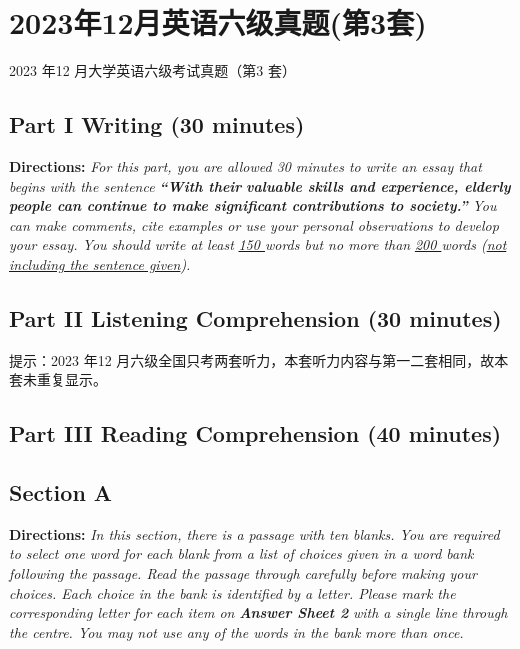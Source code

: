 \documentclass[UTF8,11pt]{ctexart}
\begin{document}
\section*{2023年12月英语六级真题(第3套)}
2023 年12 月大学英语六级考试真题（第3 套）


\subsection*{\textbf{Part I Writing} \textbf{(30 minutes)}}


\textbf{Directions:}\textit{ For this part, you are allowed 30 minutes to write an essay that begins with the sentence }\textbf{\textit{“With their}} \textbf{\textit{valuable skills and experience, elderly people can continue to make significant contributions to society.”}}\textit{ You} \textit{can make comments, cite examples or use your personal observations to develop your essay. You should write at} \textit{least }\textit{\uline{150 }}\textit{words but no more than }\textit{\uline{200 }}\textit{words (}\textit{\uline{not including the sentence given}}\textit{).}


\subsection*{\textbf{Part II} \textbf{Listening Comprehension} \textbf{(30 minutes)}}


提示：2023 年12 月六级全国只考两套听力，本套听力内容与第一二套相同，故本套未重复显示。


\subsection*{\textbf{Part III Reading Comprehension (40 minutes)}}


\subsection*{\textbf{Section A}}


\textbf{Directions:} \textit{In this section, there is a passage with ten blanks. You are required to select one word for each blank} \textit{from a list of choices given in a word bank following the passage. Read the passage through carefully before} \textit{making your choices. Each choice in the bank is identified by a letter. Please mark the corresponding letter for} \textit{each item on }\textbf{\textit{Answer Sheet 2}}\textit{ with a single line through the centre. You may not use any of the words in the bank} \textit{more than once.}
\end{document}
